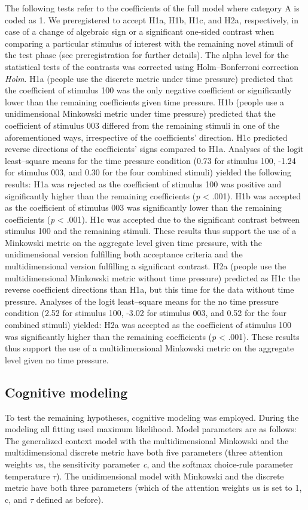 \documentclass[a4paper,man,natbib]{apa6}
\begin{document}
The following tests refer to the coefficients of the full model where category A is coded as 1. We preregistered to accept H1a, H1b, H1c, and H2a, respectively, in case of a change of algebraic sign or a significant one-sided contrast when comparing a particular stimulus of interest with the remaining novel stimuli of the test phase (see preregistration for further details). The alpha level for the statistical tests of the contrasts was corrected using Holm--Bonferroni correction \textit{Holm}. H1a (people use the discrete metric under time pressure) predicted that the coefficient of stimulus 100 was the only negative coefficient or significantly lower than the remaining coefficients given time pressure. H1b (people use a unidimensional Minkowski metric under time pressure) predicted that the coefficient of stimulus 003 differed from the remaining stimuli in one of the aforementioned ways, irrespective of the coefficients' direction. H1c predicted reverse directions of the coefficients' signs compared to H1a. Analyses of the logit least--square means for the time pressure condition (0.73 for stimulus 100, -1.24 for stimulus 003, and 0.30 for the four combined stimuli) yielded the following results: H1a was rejected as the coefficient of stimulus 100 was positive and significantly higher than the remaining coefficients (\textit{p} < .001). H1b was accepted as the coefficient of stimulus 003 was significantly lower than the remaining coefficients (\textit{p} < .001). H1c was accepted due to the significant contrast between stimulus 100 and the remaining stimuli. These results thus support the use of a Minkowski metric on the aggregate level given time pressure, with the unidimensional version fulfilling both acceptance criteria and the multidimensional version fulfilling a significant contrast. H2a (people use the multidimensional Minkowski metric without time pressure) predicted as H1c the reverse coefficient directions than H1a, but this time for the data without time pressure. Analyses of the logit least--square means for the no time pressure condition (2.52 for stimulus 100, -3.02 for stimulus 003, and 0.52 for the four combined stimuli) yielded: H2a was accepted as the coefficient of stimulus 100 was significantly higher than the remaining coefficients (\textit{p} < .001). These results thus support the use of a multidimensional Minkowski metric on the aggregate level given no time pressure.

\subsection{Cognitive modeling}
To test the remaining hypotheses, cognitive modeling was employed. During the modeling all fitting used maximum likelihood. Model parameters are as follows: The generalized context model with the multidimensional Minkowski and the multidimensional discrete metric have both five parameters (three attention weights \textit{w}s, the sensitivity parameter \textit{c}, and the softmax choice-rule parameter temperature $\tau$). The unidimensional model with Minkowski and the discrete metric have both three parameters (which of the attention weights \textit{w}s is set to 1, c, and $\tau$ defined as before).
\end{document}
